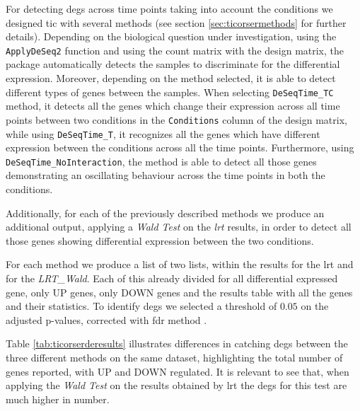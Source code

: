 For detecting \glspl{deg} across time points taking into account the conditions we designed \gls{tic} with several methods (see section \ref{sec:ticorsermethods} for further details).
Depending on the biological question under investigation, using the \lstinline!ApplyDeSeq2! function and using the count matrix with the design matrix, the package automatically detects the samples to discriminate for the differential expression.
Moreover, depending on the method selected, it is able to detect different types of genes between the samples.
When selecting \lstinline!DeSeqTime_TC! method, it detects all the genes which change their expression across all time points between two conditions in the \lstinline!Conditions! column of the design matrix, while using \lstinline!DeSeqTime_T!, it recognizes all the genes which have different expression between the conditions across all the time points. 
Furthermore, using \lstinline!DeSeqTime_NoInteraction!, the method is able to detect all those genes demonstrating an oscillating behaviour across the time points in both the conditions.

Additionally, for each of the previously described methods we produce an additional output, applying a \textit{Wald Test} on the \textit{lrt} results, in order to detect all those genes showing differential expression between the two conditions.

For each method we produce a list of two lists, within the results for the \gls{lrt} and for the \textit{LRT\_Wald}. Each of this already divided for all differential expressed gene, only UP genes, only DOWN genes and the results table with all the genes and their statistics.
To identify \glspl{deg} we selected a threshold of $0.05$ on the adjusted p-values, corrected with \gls{fdr} method \cite{Benjamini1995}.

Table \ref{tab:ticorserderesults} illustrates differences in catching \glspl{deg} between the three different methods on the same dataset, highlighting the total number of genes reported, with UP and DOWN regulated. 
It is relevant to see that, when applying the \textit{Wald Test} on the results obtained by \gls{lrt} the \glspl{deg} for this test are much higher in number.

